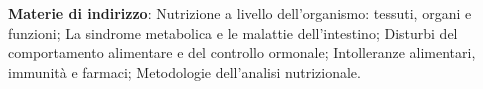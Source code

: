 \documentclass[10pt,a4paper]{altacv}
\begin{document}
\vspace{0.5em}









\textbf{Materie di indirizzo}: %
Nutrizione a livello dell'organismo: tessuti, organi e funzioni; La sindrome metabolica e le malattie dell'intestino; Disturbi del comportamento alimentare e del controllo ormonale; Intolleranze alimentari, immunità e farmaci; Metodologie dell'analisi nutrizionale.
\end{document}
